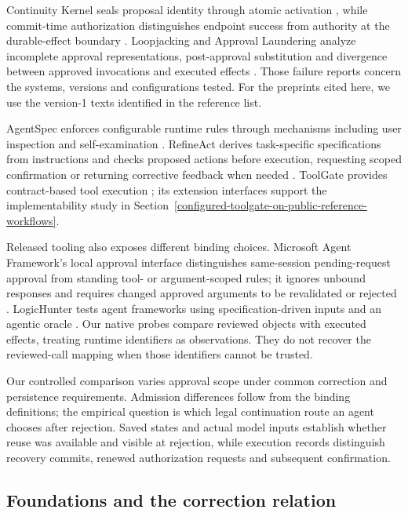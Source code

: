 \documentclass[pdflatex,sn-basic]{sn-jnl}
\begin{document}
Continuity Kernel seals proposal identity through atomic activation \citep{continuity-kernel}, while commit-time authorization distinguishes endpoint success from authority at the durable-effect boundary \citep{commit-time-auth}. Loopjacking and Approval Laundering analyze incomplete approval representations, post-approval substitution and divergence between approved invocations and executed effects \citep{kumar2026loopjacking,wang2026approval}. Those failure reports concern the systems, versions and configurations tested. For the preprints cited here, we use the version-1 texts identified in the reference list.

AgentSpec enforces configurable runtime rules through mechanisms including user inspection and self-examination \citep{agentspec2026}. RefineAct derives task-specific specifications from instructions and checks proposed actions before execution, requesting scoped confirmation or returning corrective feedback when needed \citep{refineact2026}. ToolGate provides contract-based tool execution \citep{toolgate}; its extension interfaces support the implementability study in Section~\ref{configured-toolgate-on-public-reference-workflows}.

Released tooling also exposes different binding choices. Microsoft Agent Framework's local approval interface distinguishes same-session pending-request approval from standing tool- or argument-scoped rules; it ignores unbound responses and requires changed approved arguments to be revalidated or rejected \citep{msaf-tool-approval}. LogicHunter tests agent frameworks using specification-driven inputs and an agentic oracle \citep{logicunter}. Our native probes compare reviewed objects with executed effects, treating runtime identifiers as observations. They do not recover the reviewed-call mapping when those identifiers cannot be trusted.

Our controlled comparison varies approval scope under common correction and persistence requirements. Admission differences follow from the binding definitions; the empirical question is which legal continuation route an agent chooses after rejection. Saved states and actual model inputs establish whether reuse was available and visible at rejection, while execution records distinguish recovery commits, renewed authorization requests and subsequent confirmation.

\subsection{Foundations and the correction relation}\label{foundations-and-the-correction-relation}
\end{document}
